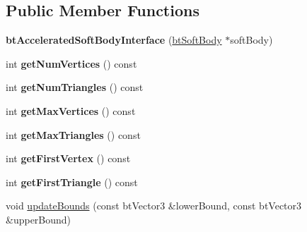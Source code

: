 \subsection*{Public Member Functions}
\begin{DoxyCompactItemize}
\item 
\mbox{\label{classbtDX11SoftBodySolver_1_1btAcceleratedSoftBodyInterface_ac685c9ac1c95a9c8b6f79c3b4bff6768}} 
{\bfseries bt\+Accelerated\+Soft\+Body\+Interface} (\hyperlink{classbtSoftBody}{bt\+Soft\+Body} $\ast$soft\+Body)
\item 
\mbox{\label{classbtDX11SoftBodySolver_1_1btAcceleratedSoftBodyInterface_a830daba7c6b4655092ae385a53f705fd}} 
int {\bfseries get\+Num\+Vertices} () const
\item 
\mbox{\label{classbtDX11SoftBodySolver_1_1btAcceleratedSoftBodyInterface_aab5248fbe7d2daefad23dfa9dd0ca51b}} 
int {\bfseries get\+Num\+Triangles} () const
\item 
\mbox{\label{classbtDX11SoftBodySolver_1_1btAcceleratedSoftBodyInterface_af18e84cf8a1554a4386ecf849a4457fb}} 
int {\bfseries get\+Max\+Vertices} () const
\item 
\mbox{\label{classbtDX11SoftBodySolver_1_1btAcceleratedSoftBodyInterface_ab4b07d4dd494b4838529794fd4a4efea}} 
int {\bfseries get\+Max\+Triangles} () const
\item 
\mbox{\label{classbtDX11SoftBodySolver_1_1btAcceleratedSoftBodyInterface_afda53746c85f7408561f3972ccf5d0ce}} 
int {\bfseries get\+First\+Vertex} () const
\item 
\mbox{\label{classbtDX11SoftBodySolver_1_1btAcceleratedSoftBodyInterface_aa24cc9b003a26e7e7a02ff74e97f9dbe}} 
int {\bfseries get\+First\+Triangle} () const
\item 
void \hyperlink{classbtDX11SoftBodySolver_1_1btAcceleratedSoftBodyInterface_ace99e4c1e9cbb3a08e5d1d2688fc02e2}{update\+Bounds} (const bt\+Vector3 \&lower\+Bound, const bt\+Vector3 \&upper\+Bound)

\end{DoxyCompactItemize}
